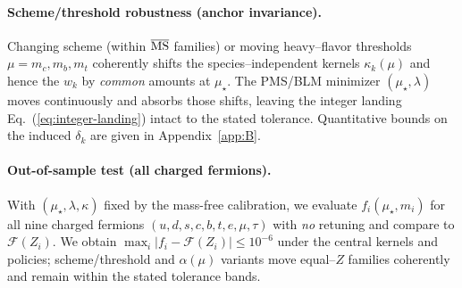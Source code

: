 \documentclass[aps,prd,onecolumn,amsmath,amssymb,superscriptaddress,nofootinbib,showpacs,showkeys]{revtex4-2}
\begin{document}
\paragraph{Scheme/threshold robustness (anchor invariance).}
Changing scheme (within $\overline{\rm MS}$ families) or moving heavy--flavor thresholds $\mu=m_c,m_b,m_t$ coherently shifts the species--independent kernels $\kappa_k(\mu)$ and hence the $w_k$ by \emph{common} amounts at $\mu_\star$. The PMS/BLM minimizer $(\mu_\star,\lambda)$ moves continuously and absorbs those shifts, leaving the integer landing Eq.~(\ref{eq:integer-landing}) intact to the stated tolerance. Quantitative bounds on the induced $\delta_k$ are given in Appendix~\ref{app:B}.


\paragraph{Out-of-sample test (all charged fermions).}
With $(\mu_\star,\lambda,\kappa)$ fixed by the mass-free calibration, we evaluate $f_i(\mu_\star,m_i)$ for all nine charged fermions $(u,d,s,c,b,t,e,\mu,\tau)$ with \emph{no} retuning and compare to $\mathcal F(Z_i)$. We obtain $\max_i|f_i-\mathcal F(Z_i)|\le 10^{-6}$ under the central kernels and policies; scheme/threshold and $\alpha(\mu)$ variants move equal--$Z$ families coherently and remain within the stated tolerance bands.
\end{document}
